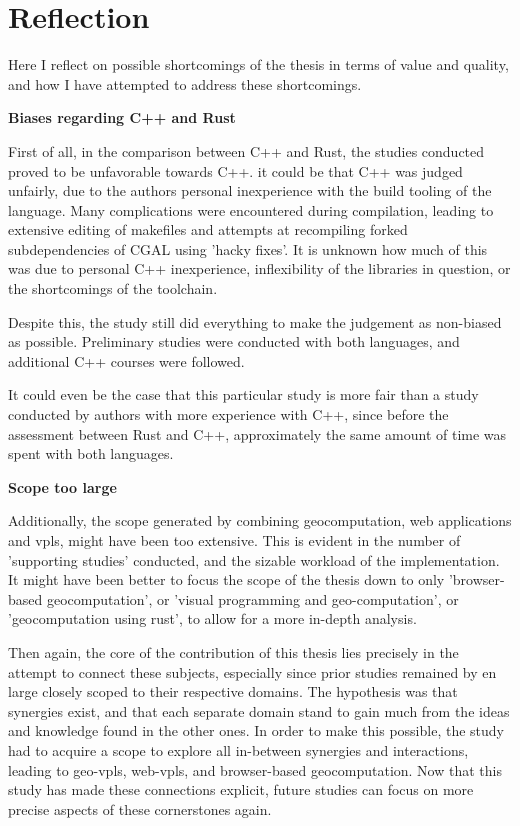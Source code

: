 



\section{Reflection}
\label{sec:reflection}

Here I reflect on possible shortcomings of the thesis in terms of value and quality, and how I have attempted to address these shortcomings. 

\textbf{Biases regarding C++ and Rust}

First of all, in the comparison between C++ and Rust, the studies conducted proved to be unfavorable towards C++. 
it could be that C++ was judged unfairly, due to the authors personal inexperience with the build tooling of the language. 
Many complications were encountered during compilation, leading to extensive editing of makefiles and attempts at recompiling forked subdependencies of CGAL using 'hacky fixes'.  
It is unknown how much of this was due to personal C++ inexperience, inflexibility of the libraries in question, or the shortcomings of the toolchain. 

Despite this, the study still did everything to make the judgement as non-biased as possible.
Preliminary studies were conducted with both languages, and additional C++ courses were followed. 

It could even be the case that this particular study is more fair than a study conducted by authors with more experience with C++, 
since before the assessment between Rust and C++, approximately the same amount of time was spent with both languages. 

\textbf{Scope too large}

Additionally, the scope generated by combining geocomputation, web applications and vpls, might have been too extensive. 
This is evident in the number of 'supporting studies' conducted, and the sizable workload of the implementation.
It might have been better to focus the scope of the thesis down to only 'browser-based geocomputation', or 'visual programming and geo-computation', or 'geocomputation using rust', to allow for a more in-depth analysis.

Then again, the core of the contribution of this thesis lies precisely in the attempt to connect these subjects,
especially since prior studies remained by en large closely scoped to their respective domains.
The hypothesis was that synergies exist, and that each separate domain stand to gain much from the ideas and knowledge found in the other ones. 
In order to make this possible, the study had to acquire a scope to explore all in-between synergies and interactions, leading to geo-vpls, web-vpls, and browser-based geocomputation. 
Now that this study has made these connections explicit, future studies can focus on more precise aspects of these cornerstones again.

